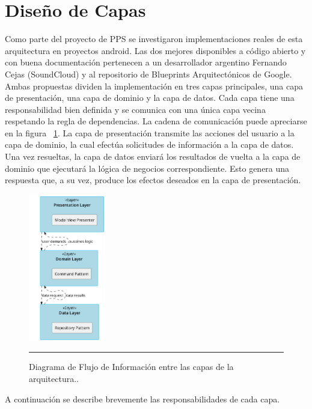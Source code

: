 \section{Diseño de Capas}
Como parte del proyecto de PPS se investigaron implementaciones reales de esta arquitectura en proyectos android.
Las dos mejores disponibles a código abierto y con buena documentación pertenecen a un desarrollador argentino Fernando Cejas \cite{clean_cejas} (SoundCloud) y al repositorio de Blueprints Arquitectónicos de Google\cite{clean_android_blueprints}.\\
Ambas propuestas dividen la implementación en tres capas principales, una capa de presentación, una capa de dominio y la capa de datos.
Cada capa tiene una responsabilidad bien definida y se comunica con una única capa vecina respetando la regla de dependencias.
La cadena de comunicación puede apreciarse en la figura ~\ref{fig:Diagrama_clasico2}. La capa de presentación transmite las acciones del usuario a la capa de dominio, la cual efectúa solicitudes de información a la capa de datos. Una vez resueltas, la capa de datos enviará los resultados de vuelta a la capa de dominio que ejecutará la lógica de negocios correspondiente. Esto genera una respuesta que, a su vez, produce los efectos deseados en la capa de presentación.\\
\begin{figure}[htbp]
	\centering
	\includegraphics[width=0.3\textwidth]{Figures/design/FLOW_clean.png}
	\rule{35em}{1pt}
	\caption[Dependencia de Módulos]{Diagrama de Flujo de Información entre las capas de la arquitectura..}
	\label{fig:Diagrama_clasico2}
\end{figure}
A continuación se describe brevemente las responsabilidades de cada capa.


